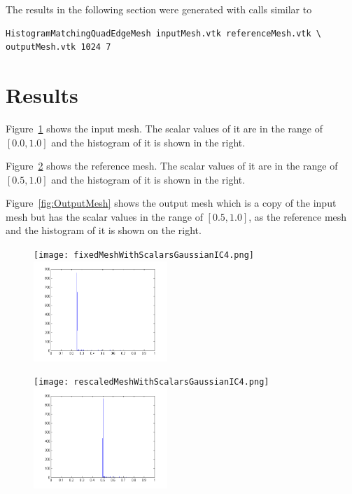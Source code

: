 \documentclass{InsightArticle}
\begin{document}
\begin{center}

\end{center}

The results in the following section were generated with calls similar to

\begin{verbatim}
HistogramMatchingQuadEdgeMesh inputMesh.vtk referenceMesh.vtk \
outputMesh.vtk 1024 7
\end{verbatim}

\section{Results}
Figure~\ref{fig:InputMesh} shows the input mesh.
The scalar values of it are in the range of $[0.0, 1.0]$
and the histogram of it is shown in the right.

Figure~\ref{fig:ReferenceMesh} shows the reference mesh.
The scalar values of it are in the range of $[0.5, 1.0]$
and the histogram of it is shown in the right.

Figure~\ref{fig:OutputMesh} shows the output mesh which is a copy of the input mesh but
has the scalar values in the range of $[0.5, 1.0]$, as the reference mesh
and the histogram of it is shown on the right.

\begin{figure}
\center
\texttt{[image: fixedMeshWithScalarsGaussianIC4.png]}
\includegraphics[width=0.45\textwidth]{inputHistogram.png}
\label{fig:InputMesh}
\end{figure}

\begin{figure}
\center
\texttt{[image: rescaledMeshWithScalarsGaussianIC4.png]}
\includegraphics[width=0.45\textwidth]{refHistogram.png}
\label{fig:ReferenceMesh}
\end{figure}
\end{document}

